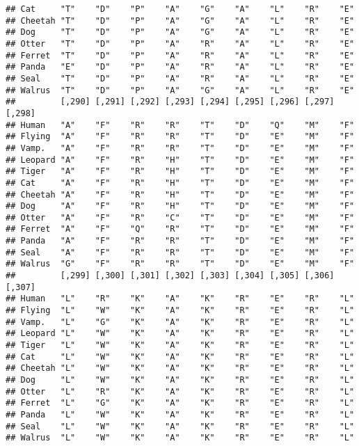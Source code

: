 \documentclass[]{article}
\begin{document}
\begin{verbatim}
## Cat     "T"    "D"    "P"    "A"    "G"    "A"    "L"    "R"    "E"   
## Cheetah "T"    "D"    "P"    "A"    "G"    "A"    "L"    "R"    "E"   
## Dog     "T"    "D"    "P"    "A"    "G"    "A"    "L"    "R"    "E"   
## Otter   "T"    "D"    "P"    "A"    "R"    "A"    "L"    "R"    "E"   
## Ferret  "T"    "D"    "P"    "A"    "R"    "A"    "L"    "R"    "E"   
## Panda   "E"    "D"    "P"    "A"    "R"    "A"    "L"    "R"    "E"   
## Seal    "T"    "D"    "P"    "A"    "R"    "A"    "L"    "R"    "E"   
## Walrus  "T"    "D"    "P"    "A"    "G"    "A"    "L"    "R"    "E"   
##         [,290] [,291] [,292] [,293] [,294] [,295] [,296] [,297] [,298]
## Human   "A"    "F"    "R"    "R"    "T"    "D"    "Q"    "M"    "F"   
## Flying  "A"    "F"    "R"    "R"    "T"    "D"    "E"    "M"    "F"   
## Vamp.   "A"    "F"    "R"    "R"    "T"    "D"    "E"    "M"    "F"   
## Leopard "A"    "F"    "R"    "H"    "T"    "D"    "E"    "M"    "F"   
## Tiger   "A"    "F"    "R"    "H"    "T"    "D"    "E"    "M"    "F"   
## Cat     "A"    "F"    "R"    "H"    "T"    "D"    "E"    "M"    "F"   
## Cheetah "A"    "F"    "R"    "H"    "T"    "D"    "E"    "M"    "F"   
## Dog     "A"    "F"    "R"    "H"    "T"    "D"    "E"    "M"    "F"   
## Otter   "A"    "F"    "R"    "C"    "T"    "D"    "E"    "M"    "F"   
## Ferret  "A"    "F"    "Q"    "R"    "T"    "D"    "E"    "M"    "F"   
## Panda   "A"    "F"    "R"    "R"    "T"    "D"    "E"    "M"    "F"   
## Seal    "A"    "F"    "R"    "R"    "T"    "D"    "E"    "M"    "F"   
## Walrus  "G"    "F"    "R"    "R"    "T"    "D"    "E"    "M"    "F"   
##         [,299] [,300] [,301] [,302] [,303] [,304] [,305] [,306] [,307]
## Human   "L"    "R"    "K"    "A"    "K"    "R"    "E"    "R"    "L"   
## Flying  "L"    "W"    "K"    "A"    "K"    "R"    "E"    "R"    "L"   
## Vamp.   "L"    "G"    "K"    "A"    "K"    "R"    "E"    "R"    "L"   
## Leopard "L"    "W"    "K"    "A"    "K"    "R"    "E"    "R"    "L"   
## Tiger   "L"    "W"    "K"    "A"    "K"    "R"    "E"    "R"    "L"   
## Cat     "L"    "W"    "K"    "A"    "K"    "R"    "E"    "R"    "L"   
## Cheetah "L"    "W"    "K"    "A"    "K"    "R"    "E"    "R"    "L"   
## Dog     "L"    "W"    "K"    "A"    "K"    "R"    "E"    "R"    "L"   
## Otter   "L"    "R"    "K"    "A"    "K"    "R"    "E"    "R"    "L"   
## Ferret  "L"    "G"    "K"    "A"    "K"    "R"    "E"    "R"    "L"   
## Panda   "L"    "W"    "K"    "A"    "K"    "R"    "E"    "R"    "L"   
## Seal    "L"    "W"    "K"    "A"    "K"    "R"    "E"    "R"    "L"   
## Walrus  "L"    "W"    "K"    "A"    "K"    "R"    "E"    "R"    "L"   

\end{verbatim}
\end{document}
